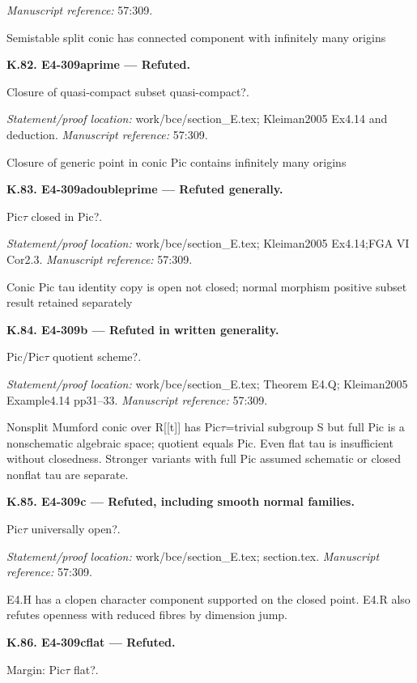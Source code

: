 \emph{Manuscript reference:} 57:309.
\par Semistable split conic has connected component with infinitely many origins
\par\medskip\noindent\textbf{K.82. E4-309aprime --- Refuted.}\par
Closure of quasi-compact subset quasi-compact?.
\par\emph{Statement/proof location:} work/bce/section\_E.tex; Kleiman2005 Ex4.14 and deduction.
\emph{Manuscript reference:} 57:309.
\par Closure of generic point in conic Pic contains infinitely many origins
\par\medskip\noindent\textbf{K.83. E4-309adoubleprime --- Refuted generally.}\par
Pic\ensuremath{\tau} closed in Pic?.
\par\emph{Statement/proof location:} work/bce/section\_E.tex; Kleiman2005 Ex4.14;FGA VI Cor2.3.
\emph{Manuscript reference:} 57:309.
\par Conic Pic tau identity copy is open not closed; normal morphism positive subset result retained separately
\par\medskip\noindent\textbf{K.84. E4-309b --- Refuted in written generality.}\par
Pic/Pic\ensuremath{\tau} quotient scheme?.
\par\emph{Statement/proof location:} work/bce/section\_E.tex; Theorem E4.Q; Kleiman2005 Example4.14 pp31–33.
\emph{Manuscript reference:} 57:309.
\par Nonsplit Mumford conic over R[[t]] has Pic\ensuremath{\tau}=trivial subgroup S but full Pic is a nonschematic algebraic space; quotient equals Pic. Even flat tau is insufficient without closedness. Stronger variants with full Pic assumed schematic or closed nonflat tau are separate.
\par\medskip\noindent\textbf{K.85. E4-309c --- Refuted, including smooth normal families.}\par
Pic\ensuremath{\tau} universally open?.
\par\emph{Statement/proof location:} work/bce/section\_E.tex; section.tex.
\emph{Manuscript reference:} 57:309.
\par E4.H has a clopen character component supported on the closed point. E4.R also refutes openness with reduced fibres by dimension jump.
\par\medskip\noindent\textbf{K.86. E4-309cflat --- Refuted.}\par
Margin: Pic\ensuremath{\tau} flat?.
